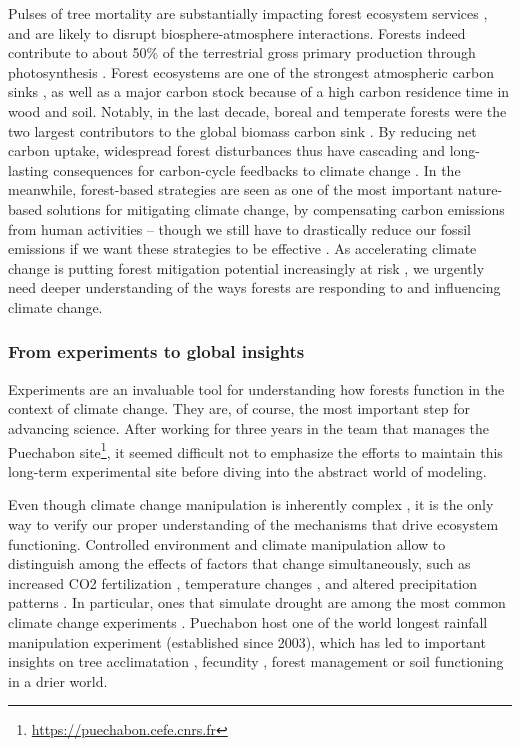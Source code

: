 Pulses of tree mortality are substantially impacting forest ecosystem services \citep{Thom2016}, and are likely to disrupt biosphere-atmosphere interactions. Forests indeed contribute to about 50\% of the terrestrial gross primary production through photosynthesis \citep{Beer2010}. Forest ecosystems are one of the strongest atmospheric carbon sinks \citep{Pan2011}, as well as a major carbon stock because of a high carbon residence time in wood and soil. Notably, in the last decade, boreal and temperate forests were the two largest contributors to the global biomass carbon sink \citep{Yang2023}. By reducing net carbon uptake, widespread forest disturbances thus have cascading and long-lasting consequences for carbon-cycle feedbacks to climate change \citep{Schwalm2012, Ciais2005, Thom2016, Kannenberg2020, Kurz2008}. In the meanwhile, forest-based strategies are seen as one of the most important nature-based solutions for mitigating climate change, by compensating carbon emissions from human activities \citep{Buma2024} -- though we still have to drastically reduce our fossil emissions if we want these strategies to be effective \citep{Roebroek2023}. As accelerating climate change is putting forest mitigation potential increasingly at risk \citep{Anderegg2020}, we urgently need deeper understanding of the ways forests are responding to and influencing climate change.

\subsubsection{From experiments to global insights} \label{sec:experiment}

Experiments are an invaluable tool for understanding how forests function in the context of climate change. They are, of course, the most important step for advancing science. After working for three years in the team that manages the Puechabon site\footnote{\url{https://puechabon.cefe.cnrs.fr}}, it seemed difficult not to emphasize the efforts to maintain this long-term experimental site before diving into the abstract world of modeling. 

Even though climate change manipulation is inherently complex \citep{Kreyling2013}, it is the only way to verify our proper understanding of the mechanisms that drive ecosystem functioning. Controlled environment and climate manipulation allow to distinguish among the effects of factors that change simultaneously, such as increased CO2 fertilization \citep{Terrer2019}, temperature changes \citep{Crowther2016}, and altered precipitation patterns \citep{Wu2011}. In particular, ones that simulate drought are among the most common climate change experiments \citep{Knapp2023}. Puechabon host one of the world longest rainfall manipulation experiment (established since 2003), which has led to important insights on tree acclimatation \citep{Limousin2022}, fecundity \citep{LeRonce2021}, forest management \citep{Gavinet2020} or soil functioning \citep{GarciaPalacios2016} in a drier world.

